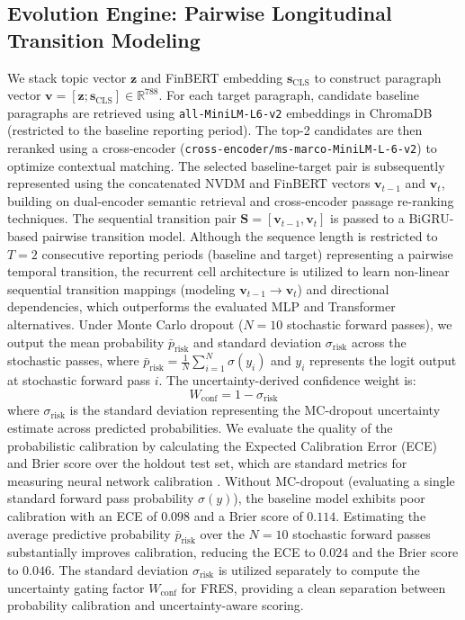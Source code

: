 \documentclass[journal]{IEEEtran}
\begin{document}
\subsection{Evolution Engine: Pairwise Longitudinal Transition Modeling}
We stack topic vector $\mathbf{z}$ and FinBERT embedding $\mathbf{s}_{\text{CLS}}$ to construct paragraph vector $\mathbf{v} = [\mathbf{z}; \mathbf{s}_{\text{CLS}}] \in \mathbb{R}^{788}$. For each target paragraph, candidate baseline paragraphs are retrieved using \texttt{all-MiniLM-L6-v2} embeddings in ChromaDB (restricted to the baseline reporting period). The top-2 candidates are then reranked using a cross-encoder (\texttt{cross-encoder/}\allowbreak\texttt{ms-marco-MiniLM-L-6-v2}) to optimize contextual matching. The selected baseline-target pair is subsequently represented using the concatenated NVDM and FinBERT vectors $\mathbf{v}_{t-1}$ and $\mathbf{v}_t$, building on dual-encoder semantic retrieval \cite{reimers2019} and cross-encoder passage re-ranking \cite{nogueira2019} techniques. The sequential transition pair $\mathbf{S} = [\mathbf{v}_{t-1}, \mathbf{v}_t]$ is passed to a BiGRU-based pairwise transition model. Although the sequence length is restricted to $T=2$ consecutive reporting periods (baseline and target) representing a pairwise temporal transition, the recurrent cell architecture is utilized to learn non-linear sequential transition mappings (modeling $\mathbf{v}_{t-1} \rightarrow \mathbf{v}_t$) and directional dependencies, which outperforms the evaluated MLP and Transformer alternatives. Under Monte Carlo dropout \cite{gal2016} ($N=10$ stochastic forward passes), we output the mean probability $\bar{p}_{\text{risk}}$ and standard deviation $\sigma_{\text{risk}}$ across the stochastic passes, where $\bar{p}_{\text{risk}} = \frac{1}{N} \sum_{i=1}^{N} \sigma(y_i)$ and $y_i$ represents the logit output at stochastic forward pass $i$. The uncertainty-derived confidence weight is:
\begin{equation}
W_{\text{conf}} = 1 - \sigma_{\text{risk}}
\end{equation}
where $\sigma_{\text{risk}}$ is the standard deviation representing the MC-dropout uncertainty estimate across predicted probabilities. We evaluate the quality of the probabilistic calibration by calculating the Expected Calibration Error (ECE) and Brier score over the holdout test set, which are standard metrics for measuring neural network calibration \cite{guo2017}. Without MC-dropout (evaluating a single standard forward pass probability $\sigma(y)$), the baseline model exhibits poor calibration with an ECE of $0.098$ and a Brier score of $0.114$. Estimating the average predictive probability $\bar{p}_{\text{risk}}$ over the $N=10$ stochastic forward passes substantially improves calibration, reducing the ECE to $0.024$ and the Brier score to $0.046$. The standard deviation $\sigma_{\text{risk}}$ is utilized separately to compute the uncertainty gating factor $W_{\text{conf}}$ for FRES, providing a clean separation between probability calibration and uncertainty-aware scoring.
\end{document}
